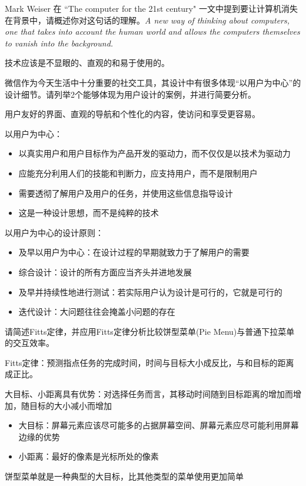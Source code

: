 \begin{problem}
Mark Weiser 在 ``The computer for the 21st century" 一文中提到要让计算机消失在背景中，请概述你对这句话的理解。\textit{A new way of thinking about computers, one that takes into account the human world and allows the computers themselves to vanish into the background.}
\end{problem}

\begin{solution}
技术应该是不显眼的、直观的和易于使用的。
\end{solution}



\begin{problem}
微信作为今天生活中十分重要的社交工具，其设计中有很多体现“以用户为中心”的设计细节。请列举2个能够体现为用户设计的案例，并进行简要分析。
\end{problem}

\begin{solution}
用户友好的界面、直观的导航和个性化的内容，使访问和享受更容易。

以用户为中心：
\begin{itemize}
    \item 以真实用户和用户目标作为产品开发的驱动力，而不仅仅是以技术为驱动力
    \item 应能充分利用人们的技能和判断力，应支持用户，而不是限制用户
    \item 需要透彻了解用户及用户的任务，并使用这些信息指导设计
    \item 这是一种设计思想，而不是纯粹的技术
\end{itemize}

以用户为中心的设计原则：
\begin{itemize}
    \item 及早以用户为中心：在设计过程的早期就致力于了解用户的需要
    \item 综合设计：设计的所有方面应当齐头并进地发展
    \item 及早并持续性地进行测试：若实际用户认为设计是可行的，它就是可行的
    \item 迭代设计：大问题往往会掩盖小问题的存在
\end{itemize}
\end{solution}



\begin{problem}
请简述Fitts定律，并应用Fitts定律分析比较饼型菜单(Pie Menu)与普通下拉菜单的交互效率。
\end{problem}

\begin{solution}
Fitts定律：预测指点任务的完成时间，时间与目标大小成反比，与和目标的距离成正比。

大目标、小距离具有优势：对选择任务而言，其移动时间随到目标距离的增加而增加，随目标的大小减小而增加
\begin{itemize}
    \item 大目标：屏幕元素应该尽可能多的占据屏幕空间、屏幕元素应尽可能利用屏幕边缘的优势
    \item 小距离：最好的像素是光标所处的像素
\end{itemize}

饼型菜单就是一种典型的大目标，比其他类型的菜单使用更加简单
\end{solution}


